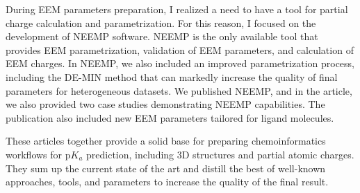 During EEM parameters preparation, I realized a need to have a tool for partial
charge calculation and parametrization. For this reason, I focused
on the development of NEEMP software. NEEMP is the only available tool that
provides EEM parametrization, validation of EEM parameters, and calculation
of EEM charges. In NEEMP, we also included an improved parametrization process,
including the DE-MIN method that can markedly increase the quality of final
parameters for heterogeneous datasets. We published NEEMP, and in the article,
we also provided two case studies demonstrating NEEMP capabilities. The
publication also included new EEM parameters tailored for ligand molecules.

These articles together provide a solid base for preparing chemoinformatics
workflows for p$K_a$ prediction, including 3D structures and partial atomic
charges. They sum up the current state of the art and distill the
best of well-known approaches, tools, and parameters to increase the quality
of the final result.


